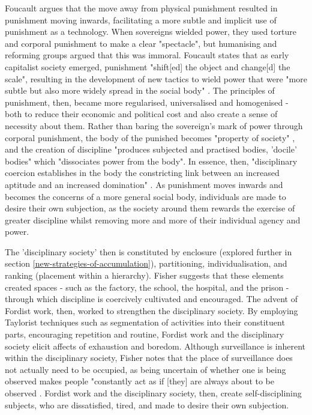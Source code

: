 Foucault argues that the move away from physical punishment resulted in punishment moving inwards, facilitating a more subtle and implicit use of punishment as a technology. When sovereigns wielded power, they used torture and corporal punishment to make a clear "spectacle", but humanising and reforming groups argued that this was immoral. Foucault states that as early capitalist society emerged, punishment "shift[ed] the object and change[d] the scale", resulting in the development of new tactics to wield power that were "more subtle but also more widely spread in the social body" \citep[89]{foucault_discipline_1977}. The principles of punishment, then, became more regularised, universalised and homogenised - both to reduce their economic and political cost and also create a sense of necessity about them. Rather than baring the sovereign's mark of power through corporal punishment, the body of the punished becomes "property of society" \citep[109]{foucault_discipline_1977}, and the creation of discipline "produces subjected and practised bodies, 'docile' bodies" which "dissociates power from the body". In essence, then, "disciplinary coercion establishes in the body the constricting link between an increased aptitude and an increased domination" \citep[138]{foucault_discipline_1977}. As punishment moves inwards and becomes the concerns of a more general social body, individuals are made to desire their own subjection, as the society around them rewards the exercise of greater discipline whilst removing more and more of their individual agency and power.

The 'disciplinary society' then is constituted by enclosure (explored further in section \ref{new-strategies-of-accumulation}), partitioning, individualisation, and ranking (placement within a hierarchy). Fisher suggests that these elements created spaces - such as the factory, the school, the hospital, and the prison - through which discipline is coercively cultivated and encouraged. The advent of Fordist work, then, worked to strengthen the disciplinary society. By employing Taylorist techniques such as segmentation of activities into their constituent parts, encouraging repetition and routine, Fordist work and the disciplinary society elicit affects of exhaustion and boredom. Although surveillance is inherent within the disciplinary society, Fisher notes that the place of surveillance does not actually need to be occupied, as being uncertain of whether one is being observed makes people "constantly act as if [they] are always about to be observed \citep[56]{fisher_capitalist_2009}. Fordist work and the disciplinary society, then, create self-disciplining subjects, who are dissatisfied, tired, and made to desire their own subjection.

